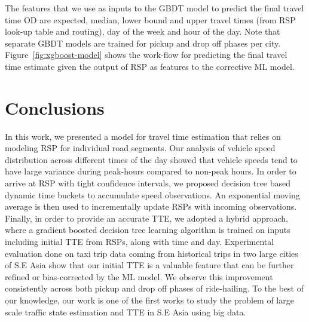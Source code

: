 \documentclass[conference]{IEEEtran}
\begin{document}
The features that we use as inputs to the GBDT model to predict the final travel time \ac{OD} are  expected, median, lower bound and upper travel times (from \ac{RSP} look-up table and routing), day of the week and hour of the day. Note that separate GBDT models are trained for pickup and drop off phases per city. Figure~\ref{fig:xgboost-model} shows the work-flow for predicting the final travel time estimate given the output of \ac{RSP} as features to the corrective \ac{ML} model. 







\section{Conclusions}
\label{sec:conclusion}

In this work, we presented a model for travel time estimation that relies on modeling \ac{RSP} for individual road segments. Our analysis of vehicle speed distribution across different times of the day showed that vehicle speeds tend to have large variance during peak-hours compared to non-peak hours. In order to arrive at RSP with tight confidence intervals, we proposed decision tree based dynamic time buckets to accumulate speed observations. An exponential moving average is then used to incrementally update RSPs with incoming observations. Finally, in order to provide an accurate TTE, we adopted a hybrid approach, where a gradient boosted decision tree learning algorithm is trained on inputs including initial TTE from RSPs, along with time and day. Experimental evaluation done on taxi trip data coming from historical trips in two large cities of S.E Asia show that our initial TTE is a valuable feature that can be further refined or bias-corrected by the ML model. We observe this improvement consistently across both pickup and drop off phases of ride-hailing. To the best of our knowledge, our work is one of the first works to study the problem of large scale traffic state estimation and \ac{TTE} in S.E Asia using big data. 

 











\ifCLASSOPTIONcaptionsoff
  \newpage
\fi



 
\end{document}
